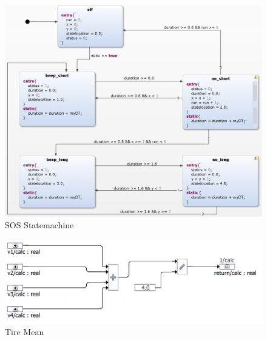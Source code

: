 \begin{figure}[h!]
	\centering
	\includegraphics[width=1\linewidth]{../Graphiken/SOS_state.png}
	\caption{SOS Statemachine}
	\label{fig:SOS_state}
\end{figure}

\begin{figure}[h!]
	\centering
	\includegraphics[width=1\linewidth]{../Graphiken/TireMean.png}
	\caption{Tire Mean}
	\label{fig:TireMean}
\end{figure}

